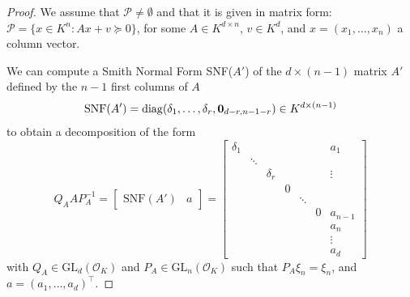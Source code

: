 \documentclass{elsarticle}
\theoremstyle{plain}
\theoremstyle{definition}
\newcommand{\PP}{\mathcal{P}}
\newcommand{\OK}{\mathcal{O}_K}
\def\diag{\mathrm{diag}}
\newcommand{\GL}{\mathrm{GL}}
\begin{document}
\begin{proof}
  We assume that $\PP \neq \emptyset$ and that it is given in
  matrix form: $\PP = \{x \in K^n : Ax+v \succeq 0\}$, for some 
  $A \in K^{d \times n}$, $v \in K^d$,
  and $x=(x_1,\dots,x_n)$ a column vector. 
  
  We can compute a Smith Normal Form SNF($A'$)
  of the $d \times (n-1)$ matrix $A'$ defined by the 
  $n-1$ first columns of $A$
  \[
\mathrm{SNF}(A') = \diag(\delta_1,\ldots,\delta_r,{\bf 0}_{d-r,n-1-r}) \in K^{d \times (n-1)}
\]
to obtain a decomposition of the form
\[
Q_A A P_A^{-1} =
\begin{bmatrix}
 \mathrm{SNF}(A') & a
\end{bmatrix}
=
\left[
\begin{smallmatrix}
\delta_1 &        &          &   &        &   & a_1     \\[-.25cm]
         & \ddots &          &   &        &   &         \\[-.35cm]
         &	  & \delta_r &   &        &   &  \vdots \\
         &	  &          & 0 &        &   &         \\[-.25cm]
         &	  &          &   & \ddots &   &         \\
         &	  &          &   &	  & 0 & a_{n-1} \\ 
         &	  &          &   &	  &   & a_n 	\\
         &	  &          &   &	  &   & \vdots 	\\
         &	  &          &   &	  &   & a_d 	
\end{smallmatrix}
\right]
\]
with $Q_A \in \GL_d(\OK)$ and $P_A \in \GL_n(\OK)$ such that $P_A \xi_n = \xi_n$,
and $a = (a_1,\ldots,a_d)^\intercal$.


\end{proof}
\end{document}
